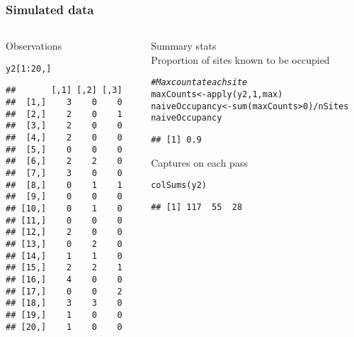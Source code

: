 \documentclass[color=usenames,dvipsnames]{beamer}\usepackage[]{graphicx}\usepackage[]{color}
\makeatletter
\newcommand{\hlnum}[1]{\textcolor[rgb]{0.69,0.494,0}{#1}}%
\newcommand{\hlcom}[1]{\textcolor[rgb]{0.514,0.506,0.514}{\textit{#1}}}%
\newcommand{\hlopt}[1]{\textcolor[rgb]{0,0,0}{#1}}%
\newcommand{\hlstd}[1]{\textcolor[rgb]{0,0,0}{#1}}%
\newcommand{\hlkwb}[1]{\textcolor[rgb]{0,0.341,0.682}{#1}}%
\newcommand{\hlkwd}[1]{\textcolor[rgb]{0.004,0.004,0.506}{#1}}%
\newenvironment{kframe}{%
 \def\at@end@of@kframe{}%
 \ifinner\ifhmode%
  \def\at@end@of@kframe{\end{minipage}}%
  \begin{minipage}{\columnwidth}%
 \fi\fi%
 \def\FrameCommand##1{\hskip\@totalleftmargin \hskip-\fboxsep
 \colorbox{shadecolor}{##1}\hskip-\fboxsep
     \hskip-\linewidth \hskip-\@totalleftmargin \hskip\columnwidth}%
 \MakeFramed {\advance\hsize-\width
   \@totalleftmargin\z@ \linewidth\hsize
   \@setminipage}}%
 {\par\unskip\endMakeFramed%
 \at@end@of@kframe}
\newenvironment{knitrout}{}{} %
\makeatother
\begin{document}
\begin{frame}[fragile]
  \frametitle{Simulated data}
  \begin{columns}
    \begin{column}{0.4\textwidth}
      \small
      Observations
\begin{knitrout}\scriptsize
{}\color{fgcolor}\begin{kframe}
\begin{alltt}
\hlstd{y2[}\hlnum{1}\hlopt{:}\hlnum{20}\hlstd{,]}
\end{alltt}
\begin{verbatim}
##       [,1] [,2] [,3]
##  [1,]    3    0    0
##  [2,]    2    0    1
##  [3,]    2    0    0
##  [4,]    2    0    0
##  [5,]    0    0    0
##  [6,]    2    2    0
##  [7,]    3    0    0
##  [8,]    0    1    1
##  [9,]    0    0    0
## [10,]    0    1    0
## [11,]    0    0    0
## [12,]    2    0    0
## [13,]    0    2    0
## [14,]    1    1    0
## [15,]    2    2    1
## [16,]    4    0    0
## [17,]    0    0    2
## [18,]    3    3    0
## [19,]    1    0    0
## [20,]    1    0    0
\end{verbatim}
\end{kframe}
\end{knitrout}
  \end{column}
  \begin{column}{0.6\textwidth}
    \pause
    {\centering Summary stats \\}
    \vspace{24pt}
    \small
    Proportion of sites known to be occupied
    \vspace{-6pt}
\begin{knitrout}\scriptsize
{}\color{fgcolor}\begin{kframe}
\begin{alltt}
\hlcom{# Max count at each site}
\hlstd{maxCounts} \hlkwb{<-} \hlkwd{apply}\hlstd{(y2,} \hlnum{1}\hlstd{, max)}
\hlstd{naiveOccupancy} \hlkwb{<-} \hlkwd{sum}\hlstd{(maxCounts}\hlopt{>}\hlnum{0}\hlstd{)}\hlopt{/}\hlstd{nSites}
\hlstd{naiveOccupancy}
\end{alltt}
\begin{verbatim}
## [1] 0.9
\end{verbatim}
\end{kframe}
\end{knitrout}
  \pause
  \vfill
  \small
  Captures on each pass
  \vspace{-6pt}
\begin{knitrout}\scriptsize
{}\color{fgcolor}\begin{kframe}
\begin{alltt}
\hlkwd{colSums}\hlstd{(y2)}
\end{alltt}
\begin{verbatim}
## [1] 117  55  28
\end{verbatim}
\end{kframe}
\end{knitrout}


\end{column}
\end{columns}
\end{frame}
\end{document}
